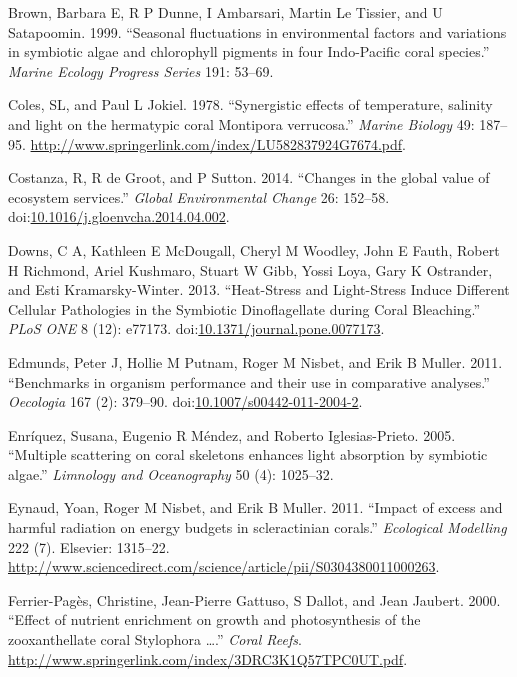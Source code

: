 \documentclass[]{elsarticle} %
\begin{document}
\hypertarget{ref-Brown:1999p3534}{}
Brown, Barbara E, R P Dunne, I Ambarsari, Martin Le Tissier, and U
Satapoomin. 1999. ``Seasonal fluctuations in environmental factors and
variations in symbiotic algae and chlorophyll pigments in four
Indo-Pacific coral species.'' \emph{Marine Ecology Progress Series} 191:
53--69.

\hypertarget{ref-Coles:1978p1124}{}
Coles, SL, and Paul L Jokiel. 1978. ``Synergistic effects of
temperature, salinity and light on the hermatypic coral Montipora
verrucosa.'' \emph{Marine Biology} 49: 187--95.
\url{http://www.springerlink.com/index/LU582837924G7674.pdf}.

\hypertarget{ref-Costanza:2014ex}{}
Costanza, R, R de Groot, and P Sutton. 2014. ``Changes in the global
value of ecosystem services.'' \emph{Global Environmental Change} 26:
152--58.
doi:\href{https://doi.org/10.1016/j.gloenvcha.2014.04.002}{10.1016/j.gloenvcha.2014.04.002}.

\hypertarget{ref-Downs:2013kc}{}
Downs, C A, Kathleen E McDougall, Cheryl M Woodley, John E Fauth, Robert
H Richmond, Ariel Kushmaro, Stuart W Gibb, Yossi Loya, Gary K Ostrander,
and Esti Kramarsky-Winter. 2013. ``Heat-Stress and Light-Stress Induce
Different Cellular Pathologies in the Symbiotic Dinoflagellate during
Coral Bleaching.'' \emph{PLoS ONE} 8 (12): e77173.
doi:\href{https://doi.org/10.1371/journal.pone.0077173}{10.1371/journal.pone.0077173}.

\hypertarget{ref-Edmunds:2011bv}{}
Edmunds, Peter J, Hollie M Putnam, Roger M Nisbet, and Erik B Muller.
2011. ``Benchmarks in organism performance and their use in comparative
analyses.'' \emph{Oecologia} 167 (2): 379--90.
doi:\href{https://doi.org/10.1007/s00442-011-2004-2}{10.1007/s00442-011-2004-2}.

\hypertarget{ref-Enriquez:2005p142}{}
Enríquez, Susana, Eugenio R Méndez, and Roberto Iglesias-Prieto. 2005.
``Multiple scattering on coral skeletons enhances light absorption by
symbiotic algae.'' \emph{Limnology and Oceanography} 50 (4): 1025--32.

\hypertarget{ref-Eynaud:2011tv}{}
Eynaud, Yoan, Roger M Nisbet, and Erik B Muller. 2011. ``Impact of
excess and harmful radiation on energy budgets in scleractinian
corals.'' \emph{Ecological Modelling} 222 (7). Elsevier: 1315--22.
\url{http://www.sciencedirect.com/science/article/pii/S0304380011000263}.

\hypertarget{ref-FerrierPages:2000p1950}{}
Ferrier-Pagès, Christine, Jean-Pierre Gattuso, S Dallot, and Jean
Jaubert. 2000. ``Effect of nutrient enrichment on growth and
photosynthesis of the zooxanthellate coral Stylophora \ldots{}.''
\emph{Coral Reefs}.
\url{http://www.springerlink.com/index/3DRC3K1Q57TPC0UT.pdf}.
\end{document}

